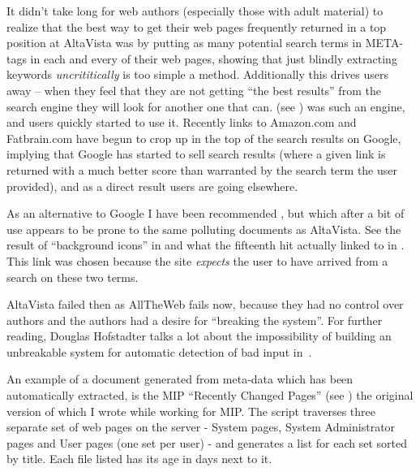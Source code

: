 It didn't take long for web authors (especially those with adult
material) to realize that the best way to get their web pages
frequently returned in a top position at AltaVista was by putting as
many potential search terms in META-tags in each and every of their
web pages, showing that just blindly extracting keywords
\textit{uncrititically} is too simple a method.  Additionally this
drives users away -- when they feel that they are not getting ``the
best results'' from the search engine they will look for another one
that can.  (see
) was such an engine, and users quickly
started to use it. Recently links to Amazon.com and Fatbrain.com have
begun to crop up in the top of the search results on Google, implying
that Google has started to sell search results (where a given link is
returned with a much better score than warranted by the search term
the user provided), and as a direct result users are going elsewhere.

As an alternative to Google I have been recommended
, but which after a bit of
use appears to be prone to the same polluting documents as AltaVista.
See the result of ``background icons'' in
 and what the fifteenth hit actually
linked to in . This link was
chosen because the site \textit{expects} the user to have
arrived from a search on these two terms.





AltaVista failed then as AllTheWeb fails now, because they had no
control over authors and the authors had a desire for ``breaking the
system''.  For further reading, Douglas Hofstadter talks a lot about
the impossibility of building an unbreakable system for automatic
detection of bad input in~\cite{goedelescherbach}.



 An example of a document generated from
meta-data which has been automatically extracted, is the MIP
``Recently Changed Pages'' (see ) the
original version of which I wrote while working for MIP.
The script traverses three separate set of web pages on the
server - System pages, System Administrator pages and User
pages (one set per user) - and generates a list for each set
sorted by title.  Each file listed has its age in days next
to it.

